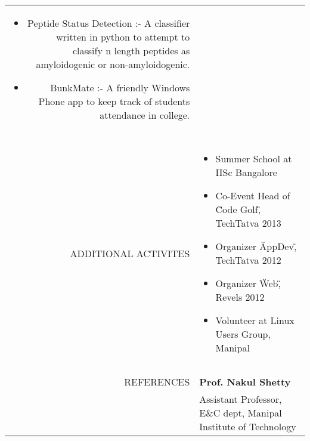 \documentclass[a4paper, 10pt]{article}
\begin{document}
\begin{tabular}{rp{13cm}}
\begin{itemize}
			\item Peptide Status Detection :- A classifier written in python to attempt to classify n length peptides as amyloidogenic or non-amyloidogenic. 
			\item BunkMate :- A friendly Windows Phone app to keep track of students attendance in college.
		\end{itemize} \\\\
		\hline
		\\
		ADDITIONAL ACTIVITES
		& \vspace{-5mm} \begin{itemize}
			\item Summer School at IISc Bangalore
			\item Co-Event Head of \"Code Golf\", TechTatva 2013
			\item Organizer \"AppDev\", TechTatva 2012
			\item Organizer \"Web\", Revels 2012
			\item Volunteer at Linux Users Group, Manipal
		\end{itemize} \\\\
		\hline
		\\
		REFERENCES
		& {\bf Prof. Nakul Shetty} \\
		& Assistant Professor, E\&C dept, Manipal Institute of Technology \\
	\end{tabular}
\end{document}
